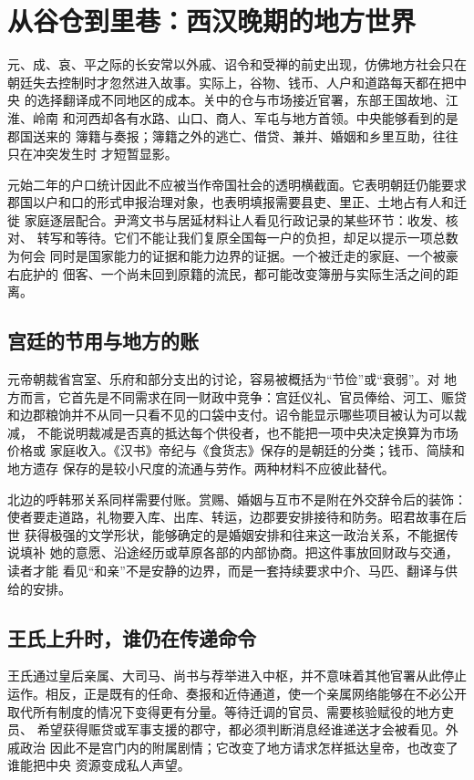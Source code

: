 \section{从谷仓到里巷：西汉晚期的地方世界}
\label{sec:han-late-western-local}

元、成、哀、平之际的长安常以外戚、诏令和受禅的前史出现，仿佛地方社会只在
朝廷失去控制时才忽然进入故事。实际上，谷物、钱币、人户和道路每天都在把中央
的选择翻译成不同地区的成本。关中的仓与市场接近官署，东部王国故地、江淮、岭南
和河西却各有水路、山口、商人、军屯与地方首领。中央能够看到的是郡国送来的
簿籍与奏报；簿籍之外的逃亡、借贷、兼并、婚姻和乡里互助，往往只在冲突发生时
才短暂显影。

元始二年的户口统计因此不应被当作帝国社会的透明横截面。它表明朝廷仍能要求
郡国以户和口的形式申报治理对象，也表明填报需要县吏、里正、土地占有人和迁徙
家庭逐层配合。尹湾文书与居延材料让人看见行政记录的某些环节：收发、核对、
转写和等待。它们不能让我们复原全国每一户的负担，却足以提示一项总数为何会
同时是国家能力的证据和能力边界的证据。一个被迁走的家庭、一个被豪右庇护的
佃客、一个尚未回到原籍的流民，都可能改变簿册与实际生活之间的距离。

\subsection{宫廷的节用与地方的账}

元帝朝裁省宫室、乐府和部分支出的讨论，容易被概括为“节俭”或“衰弱”。对
地方而言，它首先是不同需求在同一财政中竞争：宫廷仪礼、官员俸给、河工、赈贷
和边郡粮饷并不从同一只看不见的口袋中支付。诏令能显示哪些项目被认为可以裁减，
不能说明裁减是否真的抵达每个供役者，也不能把一项中央决定换算为市场价格或
家庭收入。《汉书》帝纪与《食货志》保存的是朝廷的分类；钱币、简牍和地方遗存
保存的是较小尺度的流通与劳作。两种材料不应彼此替代。

北边的呼韩邪关系同样需要付账。赏赐、婚姻与互市不是附在外交辞令后的装饰：
使者要走道路，礼物要入库、出库、转运，边郡要安排接待和防务。昭君故事在后世
获得极强的文学形状，能够确定的是婚姻安排和往来这一政治关系，不能据传说填补
她的意愿、沿途经历或草原各部的内部协商。把这件事放回财政与交通，读者才能
看见“和亲”不是安静的边界，而是一套持续要求中介、马匹、翻译与供给的安排。

\subsection{王氏上升时，谁仍在传递命令}

王氏通过皇后亲属、大司马、尚书与荐举进入中枢，并不意味着其他官署从此停止
运作。相反，正是既有的任命、奏报和近侍通道，使一个亲属网络能够在不必公开
取代所有制度的情况下变得更有分量。等待迁调的官员、需要核验赋役的地方吏员、
希望获得赈贷或军事支援的郡守，都必须判断消息经谁递送才会被看见。外戚政治
因此不是宫门内的附属剧情；它改变了地方请求怎样抵达皇帝，也改变了谁能把中央
资源变成私人声望。

